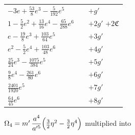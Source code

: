 \documentclass[11pt]{article}
\begin{document}
\begin{center}
\begin{tabular}{|l|l|l|}
$-3e+\tfrac{53}{8}e^{3}-\tfrac{5}{192}e^{5}$            &                              & $+g'$ \\
$1-\tfrac{5}{2}e^{2}+\tfrac{13}{16}e^{4}-\tfrac{65}{288}e^{6}$ & &                       $+2g'$ \quad $+2\mathfrak{C}$ \\
$e-\tfrac{19}{8}e^{3}+\tfrac{103}{64}e^{5}$             &                              & $+3g'$ \\
$e^{2}-\tfrac{5}{2}e^{4}+\tfrac{103}{48}e^{6}$          &                              & $+4g'$ \\
$\tfrac{25}{24}e^{3}-\tfrac{1075}{384}e^{5}$            &                              & $+5g'$ \\
$\tfrac{9}{8}e^{4}-\tfrac{261}{80}e^{6}$                &                              & $+6g'$ \\
$\tfrac{2401}{1920}e^{5}$                               &                              & $+7g'$ \\
$\tfrac{64}{45}e^{6}$                                   &                              & $+8g'$ \\
\hline
\end{tabular}
\end{center}

\bigskip
{} $\Omega_{4} = m'\,\dfrac{a^{4}}{a'^{5}}\Bigl(\tfrac{3}{2}\eta^{2}-\tfrac{3}{2}\eta^{4}\Bigr)$ multiplied into
\end{document}
